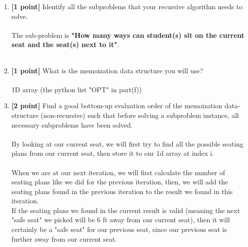 \documentclass{assignment-373}
\begin{document}
\begin{enumerate}
\begin{enumerate}
  \item \textbf{[1 point]} Identify all the subproblems that your
    recursive algorithm needs to solve.\\\\
    The sub-problem is {\bf "How many ways can student(s) sit on the current seat and the seat(s) next to it"}. \\
    \\
  \item \textbf{[1 point]} What is the memoization data structure you will use?\\\\
  \phantom{=} \phantom{=} 1D array (the python list "OPT" in part(f))\\
  \item \textbf{[2 point]} Find a good bottom-up evaluation order of the
    memoization data-structure (non-recursive) such that before
    solving a subproblem instance, all necessary subproblems have been
    solved.\\
    \\
    \phantom{=} \phantom{=} By looking at our current seat, we will first try to find all the possible seating plans from our current seat, then store it to our 1d array at index i.\\
    \\
    \phantom{=} \phantom{=} When we are at our next iteration, we will first calculate the number of seating plans like we did for the previous iteration, then, we will add the seating plans found in the previous iteration to the result we found in this iteration.\\
    \phantom{=} \phantom{=} If the seating plans we found in the current result is valid (meaning the next "safe seat" we picked will be 6 ft away from our current seat), then it will certainly be a "safe seat" for our previous seat, since our previous seat is further away from our current seat.\\
    \\
    \phantom{=} \phantom{=} 

\end{enumerate}
\end{enumerate}
\end{document}
